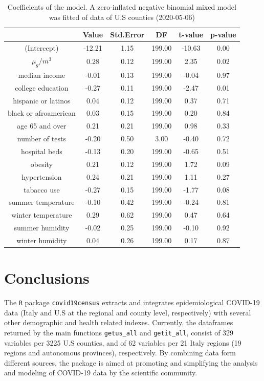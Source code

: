 \documentclass[12pt,halfline,a4paper,]{ouparticle}
\begin{document}
\begin{table}[ht]
\centering
\begin{tabular}{cccccc}
  \hline
 & Value & Std.Error & DF & t-value & p-value \\ 
  \hline
(Intercept) & -12.21 & 1.15 & 199.00 & -10.63 & 0.00 \\ 
  $\mu_g/m^3$ & 0.28 & 0.12 & 199.00 & 2.35 & 0.02 \\ 
  median income & -0.01 & 0.13 & 199.00 & -0.04 & 0.97 \\ 
  college education & -0.27 & 0.11 & 199.00 & -2.47 & 0.01 \\ 
  hispanic or latinos & 0.04 & 0.12 & 199.00 & 0.37 & 0.71 \\ 
  black or afroamerican & 0.03 & 0.15 & 199.00 & 0.20 & 0.84 \\ 
  age 65 and over & 0.21 & 0.21 & 199.00 & 0.98 & 0.33 \\ 
  number of tests & -0.20 & 0.50 & 3.00 & -0.40 & 0.72 \\ 
  hospital beds & -0.13 & 0.20 & 199.00 & -0.65 & 0.51 \\ 
  obesity & 0.21 & 0.12 & 199.00 & 1.72 & 0.09 \\ 
  hypertension & 0.24 & 0.21 & 199.00 & 1.11 & 0.27 \\ 
  tabacco use & -0.27 & 0.15 & 199.00 & -1.77 & 0.08 \\ 
  summer temperature & -0.10 & 0.42 & 199.00 & -0.24 & 0.81 \\ 
  winter temperature & 0.29 & 0.62 & 199.00 & 0.47 & 0.64 \\ 
  summer humidity & -0.02 & 0.25 & 199.00 & -0.10 & 0.92 \\ 
  winter humidity & 0.04 & 0.26 & 199.00 & 0.17 & 0.87 \\ 
   \hline
\end{tabular}
\caption{Coefficients of the model. A zero-inflated negative binomial mixed model was fitted of data of U.S counties (2020-05-06)} 
\label{tab:tab_coef}
\end{table}

\hypertarget{conclusions}{%
\section{Conclusions}\label{conclusions}}

The \texttt{R} package \texttt{covid19census} extracts and integrates
epidemiological COVID-19 data (Italy and U.S at the regional and county
level, respectively) with several other demographic and health related
indexes. Currently, the dataframes returned by the main functions
\texttt{getus\_all} and \texttt{getit\_all}, consist of 329 variables
per 3225 U.S counties, and of 62 variables per 21 Italy regions (19
regions and autonomous provinces), respectively. By combining data form
different sources, the package is aimed at promoting and simplifying the
analysis and modeling of COVID-19 data by the scientific community.
\end{document}
